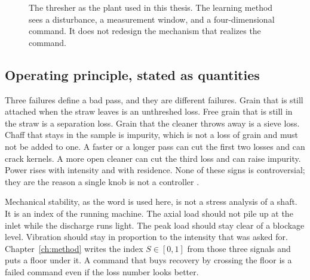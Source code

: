 \begin{figure}[ht]
\centering
{}
\caption{The thresher as the plant used in this thesis. The learning method sees a disturbance, a measurement window, and a four-dimensional command. It does not redesign the mechanism that realizes the command.}
\label{fig:flow}
\end{figure}

\subsection{Operating principle, stated as quantities}

Three failures define a bad pass, and they are different failures. Grain that is still attached when the straw leaves is an unthreshed loss. Free grain that is still in the straw is a separation loss. Grain that the cleaner throws away is a sieve loss. Chaff that stays in the sample is impurity, which is not a loss of grain and must not be added to one. A faster or a longer pass can cut the first two losses and can crack kernels. A more open cleaner can cut the third loss and can raise impurity. Power rises with intensity and with residence. None of these signs is controversial; they are the reason a single knob is not a controller \cite{fu2018,miu2008a,harrison1991}.

Mechanical stability, as the word is used here, is not a stress analysis of a shaft. It is an index of the running machine. The axial load should not pile up at the inlet while the discharge runs light. The peak load should stay clear of a blockage level. Vibration should stay in proportion to the intensity that was asked for. Chapter~\ref{ch:method} writes the index \(S\in[0,1]\) from those three signals and puts a floor under it. A command that buys recovery by crossing the floor is a failed command even if the loss number looks better.

